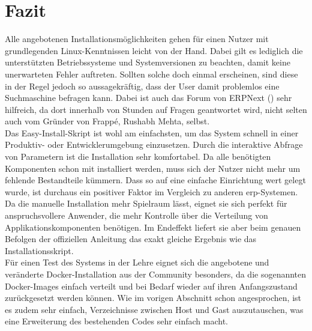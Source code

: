 \section{Fazit}
Alle angebotenen Installationsmöglichkeiten gehen für einen Nutzer mit grundlegenden Linux-Kenntnissen leicht von der Hand. Dabei gilt es lediglich die unterstützten Betriebssysteme und Systemversionen zu beachten, damit keine unerwarteten Fehler auftreten. Sollten solche doch einmal erscheinen, sind diese in der Regel jedoch so aussagekräftig, dass der User damit problemlos eine Suchmaschine befragen kann. Dabei ist auch das Forum von ERPNext (\vgl \cite{ERPNextDiscuss}) sehr hilfreich, da dort innerhalb von Stunden auf Fragen geantwortet wird, nicht selten auch vom Gründer von Frappé, Rushabh Mehta, selbst.\\
Das Easy-Install-Skript ist wohl am einfachsten, um das System schnell in einer Produktiv- oder Entwicklerumgebung einzusetzen. Durch die interaktive Abfrage von Parametern ist die Installation sehr komfortabel. Da alle benötigten Komponenten schon mit installiert werden, muss sich der Nutzer nicht mehr um fehlende Bestandteile kümmern. Dass so auf eine einfache Einrichtung wert gelegt wurde, ist durchaus ein positiver Faktor im Vergleich zu anderen \gls{erp}-Systemen.\\
Da die manuelle Installation mehr Spielraum lässt, eignet sie sich perfekt für anspruchsvollere Anwender, die mehr Kontrolle über die Verteilung von Applikationskomponenten benötigen. Im Endeffekt liefert sie aber beim genauen Befolgen der offiziellen Anleitung das exakt gleiche Ergebnis wie das Installationsskript.\\
Für einen Test des Systems in der Lehre eignet sich die angebotene und veränderte Docker-Installation aus der Community besonders, da die sogenannten Docker-Images einfach verteilt und bei Bedarf wieder auf ihren Anfangszustand zurückgesetzt werden können. Wie im vorigen Abschnitt schon angesprochen, ist es zudem sehr einfach, Verzeichnisse zwischen Host und Gast auszutauschen, was eine Erweiterung des bestehenden Codes sehr einfach macht.